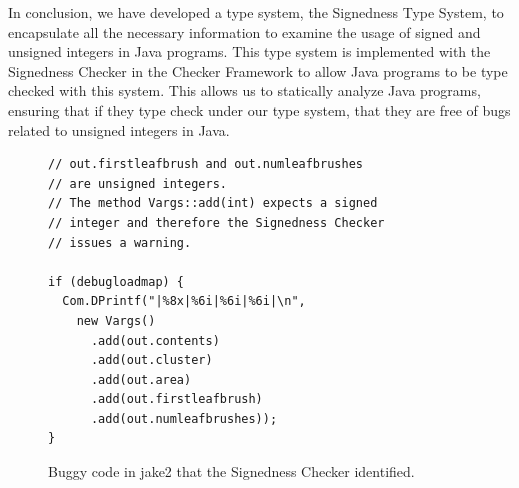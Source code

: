 \documentclass{sig-alternate-05-2015}
\begin{document}
In conclusion, we have developed a type system, the Signedness Type System, to
encapsulate all the necessary information to examine the usage of signed and unsigned
integers in Java programs. This type system is implemented with the Signedness
Checker in the Checker Framework to allow Java programs to be type checked with this
system. This allows us to statically analyze Java programs, ensuring that if they
type check under our type system, that they are free of bugs related to unsigned
integers in Java.

\begin{figure}
\begin{lstlisting}
// out.firstleafbrush and out.numleafbrushes
// are unsigned integers.
// The method Vargs::add(int) expects a signed
// integer and therefore the Signedness Checker
// issues a warning.

if (debugloadmap) {
  Com.DPrintf("|%8x|%6i|%6i|%6i|\n",
    new Vargs()
      .add(out.contents)
      .add(out.cluster)
      .add(out.area)
      .add(out.firstleafbrush)
      .add(out.numleafbrushes));
}

\end{lstlisting}
\vspace{-10pt}
\caption{Buggy code in jake2 that the Signedness Checker identified.}
\label{fig:bug}
\end{figure}



\end{document}
